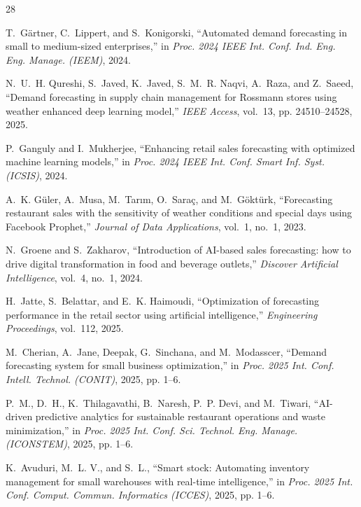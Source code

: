 \documentclass[conference]{IEEEtran}
\begin{document}
\begin{thebibliography}{28}

T.~G{\"a}rtner, C.~Lippert, and S.~Konigorski, ``Automated demand forecasting in small to medium-sized enterprises,'' in \emph{Proc. 2024 IEEE Int. Conf. Ind. Eng. Eng. Manage. (IEEM)}, 2024.

N.~U.~H. Qureshi, S.~Javed, K.~Javed, S.~M.~R. Naqvi, A.~Raza, and Z.~Saeed, ``Demand forecasting in supply chain management for Rossmann stores using weather enhanced deep learning model,'' \emph{IEEE Access}, vol.~13, pp. 24510--24528, 2025.

P.~Ganguly and I.~Mukherjee, ``Enhancing retail sales forecasting with optimized machine learning models,'' in \emph{Proc. 2024 IEEE Int. Conf. Smart Inf. Syst. (ICSIS)}, 2024.

A.~K. G{\"u}ler, A.~Musa, M.~Tar{\i}m, O.~Sara{\c{c}}, and M.~G{\"o}kt{\"u}rk, ``Forecasting restaurant sales with the sensitivity of weather conditions and special days using Facebook Prophet,'' \emph{Journal of Data Applications}, vol.~1, no.~1, 2023.

N.~Groene and S.~Zakharov, ``Introduction of AI-based sales forecasting: how to drive digital transformation in food and beverage outlets,'' \emph{Discover Artificial Intelligence}, vol.~4, no.~1, 2024.

H.~Jatte, S.~Belattar, and E.~K. Haimoudi, ``Optimization of forecasting performance in the retail sector using artificial intelligence,'' \emph{Engineering Proceedings}, vol.~112, 2025.

M.~Cherian, A.~Jane, Deepak, G.~Sinchana, and M.~Modasscer, ``Demand forecasting system for small business optimization,'' in \emph{Proc. 2025 Int. Conf. Intell. Technol. (CONIT)}, 2025, pp. 1--6.

P.~M., D.~H., K.~Thilagavathi, B.~Naresh, P.~P. Devi, and M.~Tiwari, ``AI-driven predictive analytics for sustainable restaurant operations and waste minimization,'' in \emph{Proc. 2025 Int. Conf. Sci. Technol. Eng. Manage. (ICONSTEM)}, 2025, pp. 1--6.

K.~Avuduri, M.~L. V., and S.~L., ``Smart stock: Automating inventory management for small warehouses with real-time intelligence,'' in \emph{Proc. 2025 Int. Conf. Comput. Commun. Informatics (ICCES)}, 2025, pp. 1--6.


\end{thebibliography}
\end{document}
